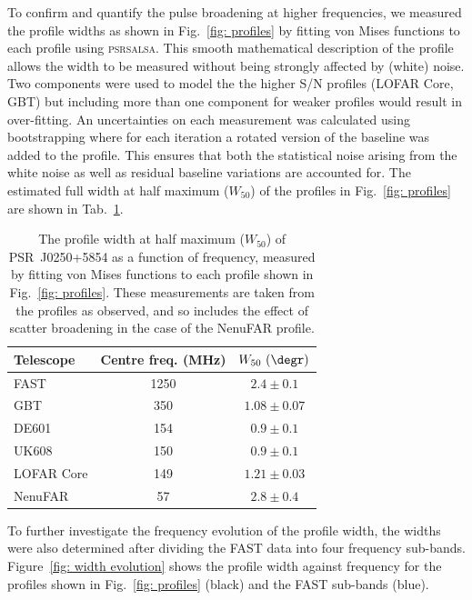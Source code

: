 To confirm and quantify the pulse broadening at higher frequencies, we measured the profile widths as shown in Fig.~\ref{fig: profiles} by fitting von Mises functions to each profile using \textsc{psrsalsa}. This smooth mathematical description of the profile allows the width to be measured without being strongly affected by (white) noise. Two components were used to model the the higher S/N profiles (LOFAR Core, GBT) but including more than one component for weaker profiles would result in over-fitting. An uncertainties on each measurement was calculated using bootstrapping where for each iteration a rotated version of the baseline was added to the profile. This ensures that both the statistical noise arising from the white noise as well as residual baseline variations are accounted for. The estimated full width at half maximum ($W_{50}$) of the profiles in Fig.~\ref{fig: profiles} are shown in Tab.~\ref{tab: W50}.%
\begin{table}
    \centering
    \caption[Measured profile width evolution with frequency]{The profile width at half maximum ($W_{50}$) of PSR~J0250+5854 as a function of frequency, measured by fitting von Mises functions to each profile shown in Fig.~\ref{fig: profiles}. These measurements are taken from the profiles as observed, and so includes the effect of scatter broadening in the case of the  NenuFAR profile.}
    \label{tab: W50}
    \begin{tabular}{lcc}
        \hline
        Telescope & Centre freq. (MHz) & $W_{50}~(\degr)$ \\
        \hline
        FAST & 1250 & $2.4\pm0.1$ \\
        GBT & 350 & $1.08\pm0.07$ \\
        DE601 & 154 & $0.9\pm0.1$ \\
        UK608 & 150 & $0.9\pm0.1$ \\
        LOFAR Core & 149 & $1.21\pm0.03$ \\
        NenuFAR & 57 & $2.8\pm0.4$ \\ 
    \end{tabular}
\end{table}
To further investigate the frequency evolution of the profile width, the widths were also determined after dividing the FAST data into four frequency sub-bands. Figure~\ref{fig: width evolution} shows the profile width against frequency for the profiles shown in Fig.~\ref{fig: profiles} (black) and the FAST sub-bands (blue).
